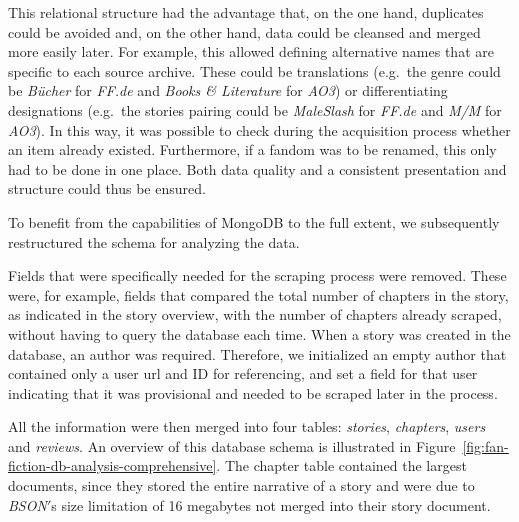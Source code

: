 This relational structure had the advantage that, on the one hand, duplicates could be avoided and, on the other hand, data could be cleansed and merged more easily later.
For example, this allowed defining alternative names that are specific to each source archive.
These could be translations (e.g.~the genre could be \emph{Bücher} for \emph{FF.de} and \emph{Books \& Literature} for \emph{AO3}) or differentiating designations (e.g.~the stories pairing could be \emph{MaleSlash} for \emph{FF.de} and \emph{M/M} for \emph{AO3}).
In this way, it was possible to check during the acquisition process whether an item already existed.
Furthermore, if a fandom was to be renamed, this only had to be done in one place.
Both data quality and a consistent presentation and structure could thus be ensured.

To benefit from the capabilities of MongoDB to the full extent, we subsequently restructured the schema for analyzing the data.

Fields that were specifically needed for the scraping process were removed.
These were, for example, fields that compared the total number of chapters in the story, as indicated in the story overview, with the number of chapters already scraped, without having to query the database each time.
When a story was created in the database, an author was required.
Therefore, we initialized an empty author that contained only a user url and ID for referencing, and set a field for that user indicating that it was provisional and needed to be scraped later in the process.

All the information were then merged into four tables: \emph{stories}, \emph{chapters}, \emph{users} and \emph{reviews}.
An overview of this database schema is illustrated in Figure~\ref{fig:fan-fiction-db-analysis-comprehensive}.
The chapter table contained the largest documents, since they stored the entire narrative of a story and were due to \emph{BSON}$'$s size limitation of 16 megabytes not merged into their story document.


